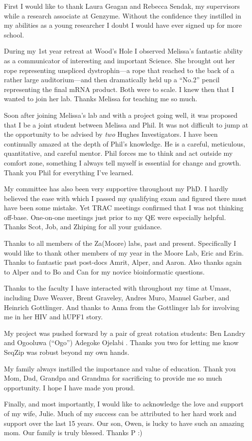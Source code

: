 \acknowledgements{}\label{hd:acknowledgements}

First I would like to thank Laura Geagan and Rebecca Sendak, my supervisors while a research associate at Genzyme. Without the confidence they instilled in my abilities as a young researcher I doubt I would have ever signed up for more school.

During my 1st year retreat at Wood’s Hole I observed Melissa's fantastic ability as a communicator of interesting and important Science. She brought out her rope representing unspliced dystrophin---a rope that reached to the back of a rather large auditorium---and then dramatically held up a ``No.2'' pencil representing the final mRNA product. Both were to scale. I knew then that I wanted to join her lab. Thanks Melissa for teaching me so much.

Soon after joining Melissa’s lab and with a project going well, it was proposed that I be a joint student between Melissa and Phil. It was not difficult to jump at the opportunity to be advised by \textit{two} Hughes Investigators. I have been continually amazed at the depth of Phil’s knowledge. He is a careful, meticulous, quantitative, and careful mentor. Phil forces me to think and act outside my comfort zone, something I always tell myself is essential for change and growth. Thank you Phil for everything I've learned.

My committee has also been very supportive throughout my PhD. I hardly believed the ease with which I passed my qualifying exam and figured there must have been some mistake. Yet TRAC meetings confirmed that I was not thinking off-base. One-on-one meetings just prior to my QE were especially helpful. Thanks Scot, Job, and Zhiping for all your guidance.

Thanks to all members of the Za(Moore) labs, past and present. Specifically I would like to thank other members of my year in the Moore Lab, Eric and Erin. Thanks to fantastic past post-docs Amrit, Alper, and Aaron. Also thanks again to Alper and to Bo and Can for my novice bioinformatic questions.

Thanks to the faculty I have interacted with throughout my time at Umass, including Dave Weaver, Brent Graveley, Andres Muro, Manuel Garber, and Heinrich Gottlinger. And thanks to Anna from the Gottlinger lab for involving me in her HIV and hUPF1 story.

My project was pushed forward by a pair of great rotation students: Ben Landry and Ogooluwa (``Ogo'') Adegoke Ojelabi . Thanks you two for letting me know SeqZip was robust beyond my own hands.

My family always instilled the importance and value of education. Thank you Mom, Dad, Grandpa and Grandma for sacrificing to provide me so much opportunity. I hope I have made you proud.

Finally, and most importantly, I would like to acknowledge the love and support of my wife, Julie. Much of my success can be attributed to her hard work and support over the last 15 years. Our son, Owen, is lucky to have such an amazing mom. Our family is truly blessed. Thanks P :)

\clearpage %